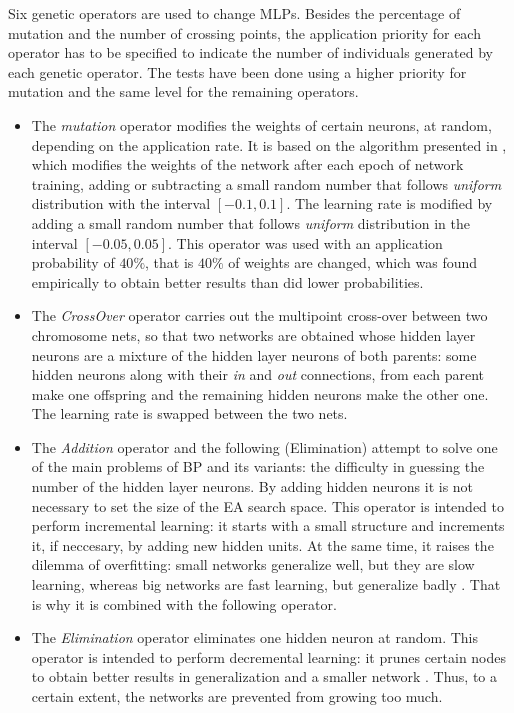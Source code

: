 \documentclass{llncs}
\begin{document}
Six genetic operators are used to change MLPs. Besides the percentage of mutation and the number of crossing points, the application priority for each operator has to be specified to indicate the number of individuals generated by each genetic operator. The tests have been done using a higher priority for mutation and the same level for the remaining operators. 
\begin{itemize}

\item The \emph{mutation} operator modifies the weights of certain neurons, at random, depending on the application rate. It is based on the algorithm presented in \cite{Kinnebrock}, which modifies the weights of the network after each epoch of network training, adding or subtracting a small random number that follows \emph{uniform} distribution with the interval $[-0.1,0.1]$.
The learning rate is modified by adding a small random number that follows \emph{uniform} distribution in the interval $[-0.05,0.05]$. This operator was used with an application probability of $40\%$, that is $40\%$ of weights are changed, which was found empirically to obtain better results than did lower probabilities.

\item The \emph{CrossOver} operator carries out the multipoint cross-over between two chromosome nets, so that two networks are obtained whose hidden layer neurons are a mixture of the hidden layer neurons of both parents: some hidden neurons along with their \emph{in} and \emph{out} connections, from each parent make one offspring and the remaining hidden neurons make the other one.
The learning rate is swapped between the two nets.

\item The \emph{Addition} operator and the following (Elimination) attempt to solve one of the main problems of BP and its variants: the difficulty in guessing the number of the hidden layer neurons. By adding hidden neurons it is not necessary to set the size of the EA search space.
This operator is intended to perform incremental learning: it starts with a small structure and increments it, if neccesary, by adding new hidden units. 
At the same time, it raises the dilemma of overfitting: small networks generalize well, but they are slow learning, whereas big networks are fast learning, but generalize badly \cite{Bellido,Bebis}. That is why it is combined with the following operator.

\item The \emph{Elimination} operator eliminates one hidden neuron at random. This operator is intended to perform decremental learning: it prunes certain nodes to obtain better results in generalization and a smaller network \cite{Jasic,Pelillo,Bebis}. Thus, to a certain extent, the networks are prevented from growing too much.


\end{itemize}
\end{document}
